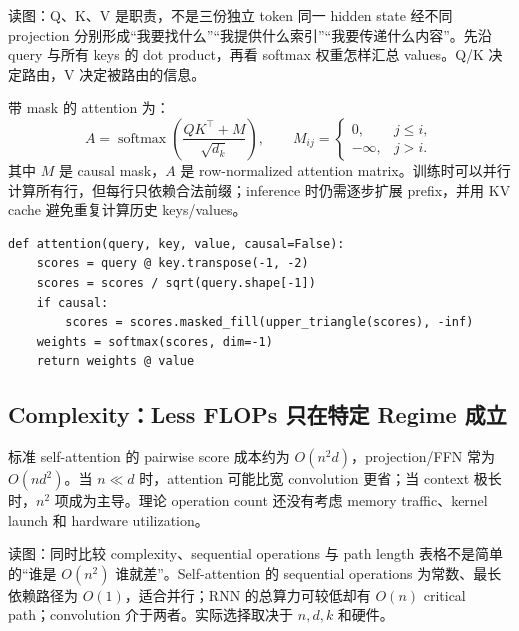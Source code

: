 
\begin{knowledgebox}{读图：Q、K、V 是职责，不是三份独立 token}
同一 hidden state 经不同 projection 分别形成“我要找什么”“我提供什么索引”“我要传递什么内容”。先沿 query 与所有 keys 的 dot product，再看 softmax 权重怎样汇总 values。Q/K 决定路由，V 决定被路由的信息。
\end{knowledgebox}


带 mask 的 attention 为：
\[
A=\operatorname{softmax}\!\left(\frac{QK^\top+M}{\sqrt{d_k}}\right),\qquad
M_{ij}=\begin{cases}0,&j\le i,\\-\infty,&j>i.\end{cases}
\]
其中 $M$ 是 causal mask，$A$ 是 row-normalized attention matrix。训练时可以并行计算所有行，但每行只依赖合法前缀；inference 时仍需逐步扩展 prefix，并用 KV cache 避免重复计算历史 keys/values。

\begin{lstlisting}[caption={Scaled dot-product attention 与 causal mask 的概念实现}]
def attention(query, key, value, causal=False):
    scores = query @ key.transpose(-1, -2)
    scores = scores / sqrt(query.shape[-1])
    if causal:
        scores = scores.masked_fill(upper_triangle(scores), -inf)
    weights = softmax(scores, dim=-1)
    return weights @ value
\end{lstlisting}

\subsection{Complexity：Less FLOPs 只在特定 Regime 成立}

标准 self-attention 的 pairwise score 成本约为 $O(n^2d)$，projection/FFN 常为 $O(nd^2)$。当 $n\ll d$ 时，attention 可能比宽 convolution 更省；当 context 极长时，$n^2$ 项成为主导。理论 operation count 还没有考虑 memory traffic、kernel launch 和 hardware utilization。


\begin{knowledgebox}{读图：同时比较 complexity、sequential operations 与 path length}
表格不是简单的“谁是 $O(n^2)$ 谁就差”。Self-attention 的 sequential operations 为常数、最长依赖路径为 $O(1)$，适合并行；RNN 的总算力可较低却有 $O(n)$ critical path；convolution 介于两者。实际选择取决于 $n,d,k$ 和硬件。
\end{knowledgebox}

